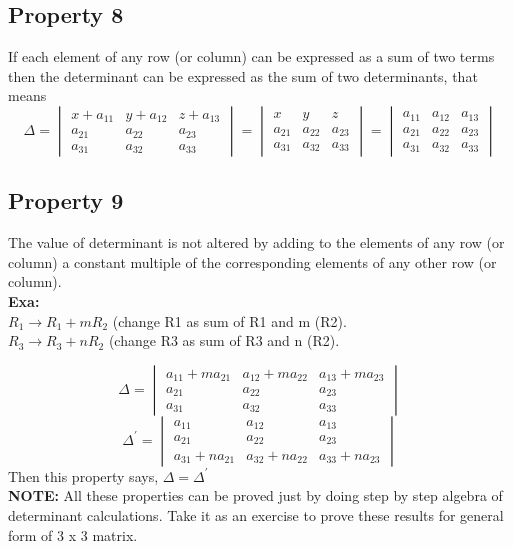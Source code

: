 \documentclass{article}
\begin{document}
\subsection*{Property 8}
If each element of any row (or column) can be
expressed as a sum of two terms then the
determinant can be expressed as the sum of two
determinants, that means
\begin{equation*}
    \Delta=
    \begin{vmatrix}
        x+a_{11} & y+a_{12} & z+a_{13} \\
        a_{21} & a_{22} & a_{23} \\
        a_{31} & a_{32} & a_{33} 
    \end{vmatrix}
    =
    \begin{vmatrix}
        x & y & z \\
        a_{21} & a_{22} & a_{23} \\
        a_{31} & a_{32} & a_{33} 
    \end{vmatrix}
    =
    \begin{vmatrix}
        a_{11} & a_{12} & a_{13} \\
        a_{21} & a_{22} & a_{23} \\
        a_{31} & a_{32} & a_{33} 
    \end{vmatrix}
\end{equation*}
\subsection*{Property 9}
The value of determinant is not altered by adding to the elements of any row (or column) a constant multiple of the corresponding elements of any other row (or column).\\
\textbf{Exa: }\\
$R_1 \rightarrow R_1 + mR_2$ (change R1 as sum of R1 and m (R2).\\
$R_3 \rightarrow R_3 + nR_2$ (change R3 as sum of R3 and n (R2).

\begin{equation*}
    \Delta=
    \begin{vmatrix}
        a_{11}+ma_{21} & a_{12}+ma_{22} & a_{13}+ma_{23} \\
        a_{21} & a_{22} & a_{23} \\
        a_{31} & a_{32} & a_{33} 
    \end{vmatrix}
\end{equation*}
\begin{equation*}
    \Delta^{'}=
    \begin{vmatrix}
        a_{11} & a_{12} & a_{13} \\
        a_{21} & a_{22} & a_{23} \\
        a_{31}+na_{21} & a_{32}+na_{22} & a_{33}+na_{23} 
    \end{vmatrix}
\end{equation*}
Then this property says, $\Delta=\Delta^{'}$\\
\textbf{NOTE:} All these properties can be proved just by doing step by step algebra of determinant calculations. Take it as an exercise to prove these results for general form of 3 x 3 matrix.
\end{document}
